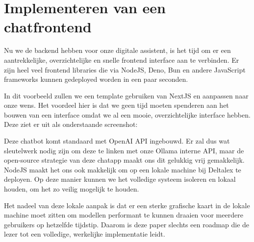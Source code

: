 \chapter{Implementeren van een chatfrontend}
Nu we de backend hebben voor onze digitale assistent, is het tijd om er een aantrekkelijke, overzichtelijke en snelle frontend interface aan te verbinden. 
Er zijn heel veel frontend libraries die via NodeJS, Deno, Bun en andere JavaScript frameworks kunnen gedeployed worden in een paar seconden. 

In dit voorbeeld zullen we een template gebruiken van NextJS en aanpassen naar onze wens. 
Het voordeel hier is dat we geen tijd moeten spenderen aan het bouwen van een interface omdat we al een mooie, overzichtelijke interface hebben. Deze ziet er uit als onderstaande screenshot:

\begin{figure}[h]
\end{figure}
\newpage

Deze chatbot komt standaard met OpenAI API ingebouwd. 
Er zal dus wat sleutelwerk nodig zijn om deze te linken met onze Ollama interne API, maar de open-source strategie van deze chatapp maakt ons dit gelukkig vrij gemakkelijk. 
NodeJS maakt het ons ook makkelijk om op een lokale machine bij Deltalex te deployen. 
Op deze manier kunnen we het volledige systeem isoleren en lokaal houden, om het zo veilig mogelijk te houden. 

Het nadeel van deze lokale aanpak is dat er een sterke grafische kaart in de lokale machine moet zitten om modellen performant te kunnen draaien voor meerdere gebruikers op hetzelfde tijdstip. 
Daarom is deze paper slechts een roadmap die de lezer tot een volledige, werkelijke implementatie leidt. 
